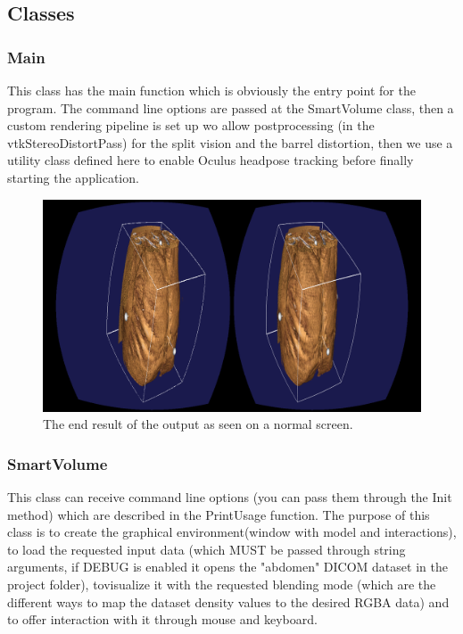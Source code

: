 \documentclass[11pt]{article} %
\begin{document}
\subsection{Classes}

%
\subsubsection{Main}
This class has the main function which is obviously the entry point for the program. The command line options are passed at the SmartVolume class, then a custom rendering pipeline is set up wo allow postprocessing (in the vtkStereoDistortPass) for the split vision and the barrel distortion, then we use a utility class defined here to enable Oculus headpose tracking before finally starting the application.

\begin{figure}[h!]
  \centering
\includegraphics[width=1.0\linewidth]{img/main_using.PNG}
  \caption{The end result of the output as seen on a normal screen.}
  \label{endResult}
\end{figure}

%
\FloatBarrier
\pagebreak
\subsubsection{SmartVolume}
This class can receive command line options (you can pass them through the Init method) which are described in the PrintUsage function. The purpose of this class is to create the graphical environment(window with model and interactions), to load the requested input data (which MUST be passed through string arguments, if DEBUG is enabled it opens the "abdomen" DICOM dataset in the project folder), tovisualize it with the requested blending mode (which are the different ways to map the dataset density values to the desired RGBA data) and to offer interaction with it through mouse and keyboard.
\end{document}

